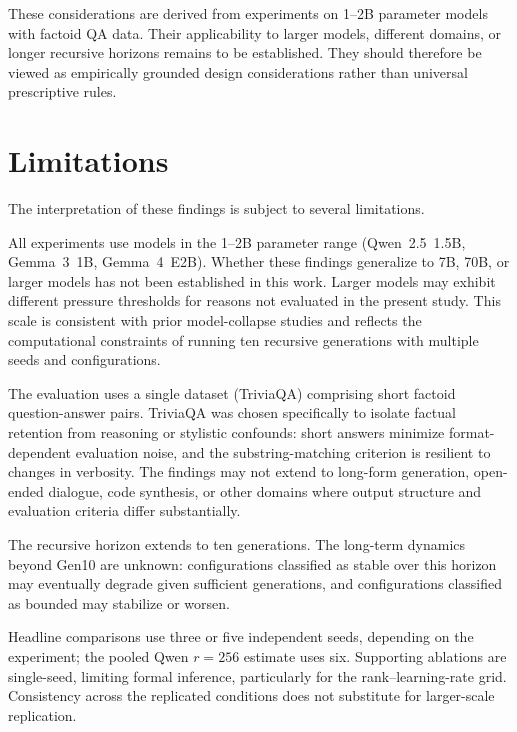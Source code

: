 \documentclass[a4paper,fleqn]{cas-dc}
\newif\ifshowchanges
\newcommand{\rev}[1]{\ifshowchanges{\color{blue}#1}\else{#1}\fi}
\begin{document}
These considerations are derived from experiments on 1--2B parameter models with
factoid QA data. Their applicability to larger models, different domains, or
longer recursive horizons remains to be established. They should therefore be
viewed as empirically grounded design considerations rather than universal
prescriptive rules.

\section{Limitations}\label{sec:limitations}

The interpretation of these findings is subject to several limitations.

All experiments use models in the 1--2B parameter range (Qwen~2.5~1.5B,
Gemma~3~1B, Gemma~4~E2B). Whether these findings generalize to 7B, 70B, or
larger models has not been established in this work. Larger models may exhibit
different pressure thresholds for reasons not evaluated in the present study.
This scale is consistent with prior model-collapse studies
\citep{shumailov2024,keisha2025} and reflects the computational constraints of
running ten recursive generations with multiple seeds and configurations.

The evaluation uses a single dataset (TriviaQA) comprising short factoid
question-answer pairs. TriviaQA was chosen specifically to isolate factual
retention from reasoning or stylistic confounds: short answers minimize
format-dependent evaluation noise, and the substring-matching criterion is
resilient to changes in verbosity. The findings may not extend to long-form
generation, open-ended dialogue, code synthesis, or other domains where output
structure and evaluation criteria differ substantially.

The recursive horizon extends to ten generations. The long-term dynamics beyond
Gen10 are unknown: configurations classified as stable over this horizon
may eventually degrade given sufficient generations, and configurations
classified as bounded may stabilize or worsen.

Headline comparisons use three or five independent seeds, depending on
the experiment; the pooled Qwen $r=256$ estimate uses six. \rev{Supporting
ablations are single-seed, limiting formal inference, particularly for
the rank--learning-rate grid. Consistency across the replicated
conditions does not substitute for larger-scale replication.}
\end{document}
